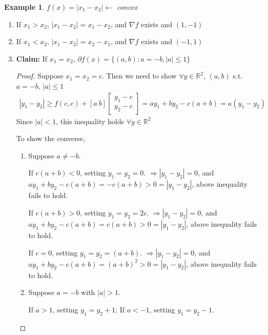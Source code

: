 \documentclass[11pt,a4paper]{article}
\newtheorem{example}{Example}
\begin{document}
\begin{example}
    $f(x)=|x_1-x_2|\leftarrow$ convex
\end{example}
\begin{enumerate}[$\bullet$]
    \item If $x_1>x_2$, $|x_1-x_2|=x_1-x_2$, and $\nabla f$ exists and $(1,-1)$
    \item If $x_1<x_2$, $|x_1-x_2|=x_2-x_1$, and $\nabla f$ exists and $(-1,1)$
    \item \textbf{Claim:} If $x_1=x_2$, $\partial f(x)=\{(a,b):a=-b,|a|\leq 1\}$
    \begin{proof}
        Suppose $x_1=x_2=c$. Then we need to show $\forall y\in \mathbb{R}^2$, $(a,b)$ s.t. $a=-b$, $|a|\leq 1$
        \begin{equation}
            \begin{aligned}
                |y_1-y_2|\geq f(c,c)+[a\ b]\begin{bmatrix}
                    y_1-c\\
                    y_2-c
                \end{bmatrix}=ay_1+by_2-c(a+b)=a(y_1-y_2)
            \end{aligned}
            \nonumber
        \end{equation}
        Since $|a|<1$, this inequality holds $\forall y\in \mathbb{R}^2$
        
        To show the converse,
        \begin{enumerate}
            \item Suppose $a\neq -b$.
            
            If $c(a+b)<0$, setting $y_1=y_2=0$. $\Rightarrow |y_1-y_2|=0$, and $ay_1+by_2-c(a+b)=-c(a+b)>0=|y_1-y_2|$, above inequality fails to hold.
    
            If $c(a+b)>0$, setting $y_1=y_2=2c$. $\Rightarrow |y_1-y_2|=0$, and $ay_1+by_2-c(a+b)=c(a+b)>0=|y_1-y_2|$, above inequality fails to hold.
    
            If $c=0$, setting $y_1=y_2=(a+b)$. $\Rightarrow |y_1-y_2|=0$, and $ay_1+by_2-c(a+b)=(a+b)^2>0=|y_1-y_2|$, above inequality fails to hold.
            \item Suppose $a=-b$ with $|a|>1$.
            
            If $a>1$, setting $y_1=y_2+1$; If $a<-1$, setting $y_1=y_2-1$.
    
        \end{enumerate}
    \end{proof}
\end{enumerate}
\end{document}

